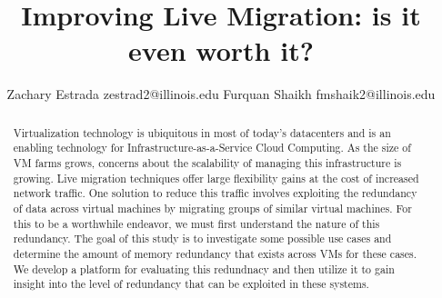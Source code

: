 \documentclass{acm_proc_article-sp}
\begin{document}
\title{Improving Live Migration: is it even worth it?}
%
%
%
%

%
\author{
%
%
\alignauthor
Zachary Estrada
\email zestrad2@illinois.edu
\alignauthor
Furquan Shaikh
\email fmshaik2@illinois.edu
}

\maketitle
\begin{abstract}
Virtualization technology is ubiquitous in most of today's datacenters and is an enabling technology for Infrastructure-as-a-Service Cloud Computing.  As the size of VM farms grows, concerns about the scalability of managing this infrastructure is growing.  Live migration techniques offer large flexibility gains at the cost of increased network traffic.  One solution to reduce this traffic involves exploiting the redundancy of data across virtual machines by migrating groups of similar virtual machines.  For this to be a worthwhile endeavor, we must first understand the nature of this redundancy.  The goal of this study is to investigate some possible use cases and determine the amount of memory redundancy that exists across VMs for these cases.  We develop a platform for evaluating this redundnacy and then utilize it to gain insight into the level of redundancy that can be exploited in these systems.
\end{abstract}
\end{document}
